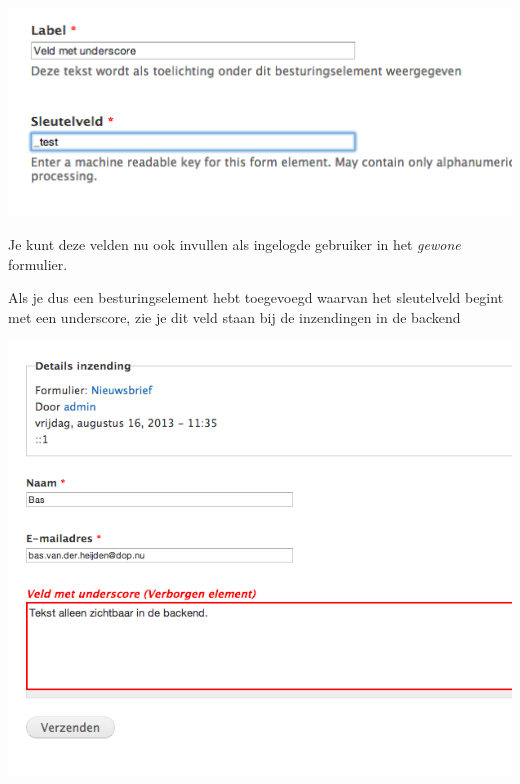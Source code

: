 \begin{center}
\includegraphics[width=\textwidth]{img/verborgenveld1.png}
\end{center}
Je kunt deze velden nu ook invullen als ingelogde gebruiker in het \emph{gewone} formulier.

Als je dus een besturingselement hebt toegevoegd waarvan het sleutelveld begint met een underscore, zie je dit veld staan bij de inzendingen in de backend

\begin{center}
\includegraphics[width=\textwidth]{img/verborgenveld2.png}
\end{center}